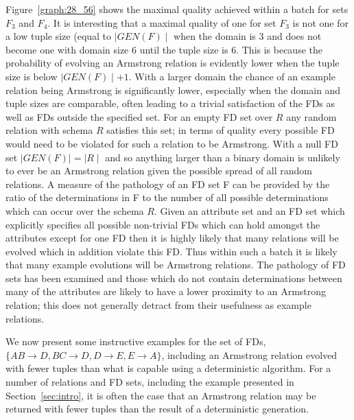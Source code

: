 Figure~\ref{graph:28_56} shows the maximal quality achieved within a 
batch for sets $F_3$ and $F_4$.  It is interesting that a maximal
quality of one for set $F_3$ is not one for a low tuple size (equal
to $\mid GEN(F) \mid$ when the domain is 3 and does not become one with
domain size 6 until the tuple size is 6. This is because the probability
of evolving an Armstrong relation is evidently lower when the tuple size
 is below
$\mid GEN(F) \mid + 1$. With a larger domain the chance of an example
relation being Armstrong is significantly lower, especially when the
domain and tuple sizes are comparable, often leading to a trivial
satisfaction of the FDs as well as FDs outside the specified set.
For an empty FD set over $R$ any random relation with schema $R$ satisfies this set;
in terms of quality every possible FD would need to be violated for such
a relation to be Armstrong.
 With a null FD set $\mid GEN(F) \mid = \mid R \mid$ and so
anything larger than a binary domain is unlikely to ever be an Armstrong
relation given the possible spread of all random relations. A measure
of the pathology of an FD set F can be
 provided by the ratio
of the determinations in F to the number of all possible determinations
which can occur over the schema $R$.
Given an attribute set and an FD set
which explicitly specifies all possible non-trivial FDs which
can hold amongst the attributes except for one FD then it is highly likely that
many relations will be evolved which in addition violate this FD. Thus within
such a batch it is likely that many example evolutions will be Armstrong
relations. The
pathology of FD sets has been examined and those which do not 
contain determinations between many of the attributes are
likely to have a lower proximity to an Armstrong relation; this does
not generally detract from their usefulness as example relations.

\medskip


We now
present some instructive examples for the set of FDs, $\{ AB \to D, 
BC \to D, D \to E, E \to A \}$, including an Armstrong relation
evolved with fewer tuples than what is capable using a 
deterministic algorithm. For a number of relations and FD sets,
including the example presented in Section~\ref{sec:intro}, it is often the
case that an Armstrong relation may be returned with fewer tuples than
the result of a deterministic generation.

